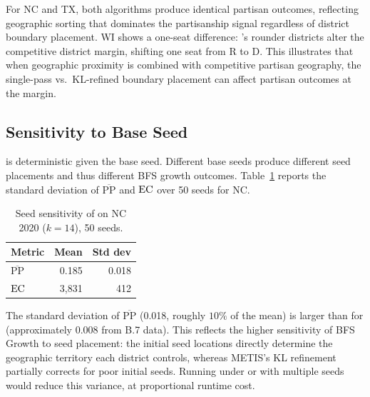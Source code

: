 For NC and TX, both algorithms produce identical partisan outcomes,
reflecting geographic sorting that dominates the partisanship signal
regardless of district boundary placement.
WI shows a one-seat difference: \bfsg{}'s rounder districts alter the
competitive district margin, shifting one seat from R to D.
This illustrates that when geographic proximity is combined with
competitive partisan geography, the single-pass vs.\ KL-refined boundary
placement can affect partisan outcomes at the margin.

\subsection{Sensitivity to Base Seed}

\bfsg{} is deterministic given the base seed.
Different base seeds produce different seed placements and thus different
BFS growth outcomes.
Table~\ref{tab:seed-sensitivity} reports the standard deviation of
$\overline{\mathrm{PP}}$ and $\mathrm{EC}$ over 50 seeds for NC.

\begin{table}[t]
\centering
\caption{Seed sensitivity of \bfsg{} on NC 2020 ($k=14$), 50 seeds.}
\label{tab:seed-sensitivity}
\begin{tabular}{lrr}
\toprule
Metric & Mean & Std dev \\
\midrule
$\overline{\mathrm{PP}}$ & 0.185 & 0.018 \\
$\mathrm{EC}$                    & 3{,}831 & 412 \\
\bottomrule
\end{tabular}
\end{table}

The standard deviation of $\overline{\mathrm{PP}}$ (0.018, roughly $10\%$
of the mean) is larger than for \metis{} (approximately $0.008$ from B.7
data).
This reflects the higher sensitivity of BFS Growth to seed placement:
the initial seed locations directly determine the geographic territory
each district controls, whereas METIS's KL refinement partially corrects
for poor initial seeds.
Running \bfsg{} under \be{} or \cs{} with multiple seeds would reduce
this variance, at proportional runtime cost.
